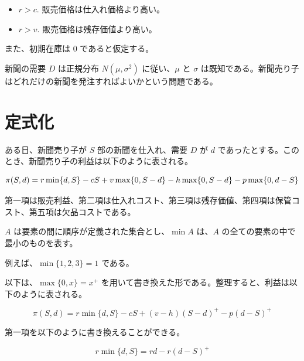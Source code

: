 \documentclass[
  japanese,
  letterpaper,
]{ltjbook}
\providecommand{\tightlist}{%
  \setlength{\itemsep}{0pt}\setlength{\parskip}{0pt}}
\theoremstyle{plain}
\theoremstyle{definition}
\theoremstyle{remark}
\begin{document}
\begin{itemize}
\tightlist
\item
  \(r > c\). 販売価格は仕入れ価格より高い。
\item
  \(r > v\). 販売価格は残存価値より高い。
\end{itemize}

また、初期在庫は 0 であると仮定する。

新聞の需要 \(D\) は正規分布 \(N(\mu, \sigma^2)\) に従い、\(\mu\) と
\(\sigma\)
は既知である。新聞売り子はどれだけの新聞を発注すればよいかという問題である。

\section{定式化}\label{ux5b9aux5f0fux5316}

ある日、新聞売り子が \(S\) 部の新聞を仕入れ、需要 \(D\) が \(d\)
であったとする。このとき、新聞売り子の利益は以下のように表される。

\[
\pi(S, d) = r \min\{d, S\} - cS + v \max\{0, S - d\} \\
- h \max\{0, S - d\} - p \max\{0, d - S\}
\]

第一項は販売利益、第二項は仕入れコスト、第三項は残存価値、第四項は保管コスト、第五項は欠品コストである。

\begin{tcolorbox}[enhanced jigsaw, colbacktitle=quarto-callout-note-color!10!white, breakable, opacitybacktitle=0.6, bottomrule=.15mm, title=\textcolor{quarto-callout-note-color}{\faInfo}\hspace{0.5em}{ノート}, leftrule=.75mm, toprule=.15mm, titlerule=0mm, colback=white, colframe=quarto-callout-note-color-frame, bottomtitle=1mm, toptitle=1mm, arc=.35mm, rightrule=.15mm, opacityback=0, left=2mm, coltitle=black]

\(A\) は要素の間に順序が定義された集合とし、\(\min A\) は、\(A\)
の全ての要素の中で最小のものを表す。

例えば、\(\min \{1, 2, 3\} = 1\) である。

\end{tcolorbox}

以下は、\(\max\{0, x\} = x^+\)
を用いて書き換えた形である。整理すると、利益は以下のように表される。

\[
\pi(S, d) = r \min\{d, S\} - cS + (v - h) (S - d)^+ - p (d - S)^+
\]

第一項を以下のように書き換えることができる。

\[
r \min\{d, S\} = r d - r (d - S)^+
\]
\end{document}
